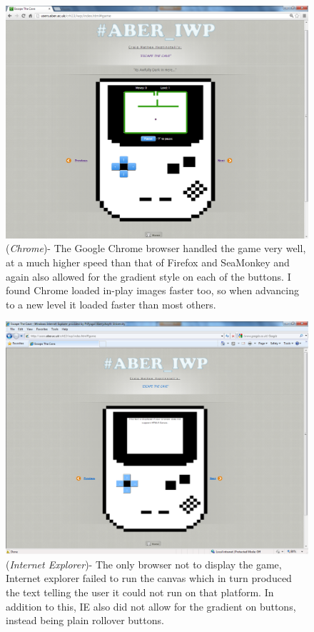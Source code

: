 \documentclass[a4paper]{article}
\begin{document}
 \begin{figure}[!ht]
   \centering
   \includegraphics[scale=0.4]{chrome.png}
  \caption{(\emph{Chrome})- The Google Chrome browser handled the game very
well, at a much higher speed than that of Firefox and SeaMonkey and again also
allowed for the gradient style on each of the buttons. I found Chrome loaded
in-play images faster too, so when advancing to a new level it loaded faster
than most others.}
   \end{figure}
   \begin{figure}[!ht]
   \centering
   \includegraphics[scale=0.4]{ie.png}
  \caption{(\emph{Internet Explorer})- The only browser not to display the game,
Internet explorer failed to run the canvas which in turn produced the text
telling the user it could not run on that platform. In addition to this, IE also
did not allow for the gradient on buttons, instead being plain rollover
buttons.}
   \end{figure}
\end{document}
